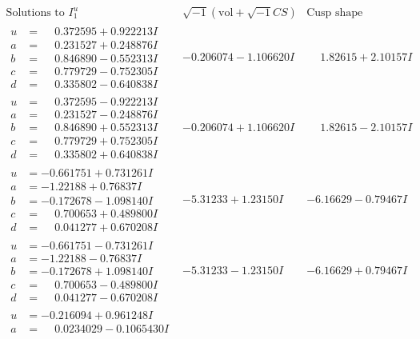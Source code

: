 \documentclass[1p]{elsarticle_modified}
\theoremstyle{definition}
\newcommand{\I}{\sqrt{-1}}
\begin{document}
$$\begin{array}{c|c|c}  
\text{Solutions to }I^u_{1}& \I (\text{vol} + \sqrt{-1}CS) & \text{Cusp shape}\\
 \hline 
\begin{aligned}
u &= \phantom{-}0.372595 + 0.922213 I \\
a &= \phantom{-}0.231527 + 0.248876 I \\
b &= \phantom{-}0.846890 - 0.552313 I \\
c &= \phantom{-}0.779729 - 0.752305 I \\
d &= \phantom{-}0.335802 - 0.640838 I\end{aligned}
 & -0.206074 - 1.106620 I & \phantom{-}1.82615 + 2.10157 I \\ \hline\begin{aligned}
u &= \phantom{-}0.372595 - 0.922213 I \\
a &= \phantom{-}0.231527 - 0.248876 I \\
b &= \phantom{-}0.846890 + 0.552313 I \\
c &= \phantom{-}0.779729 + 0.752305 I \\
d &= \phantom{-}0.335802 + 0.640838 I\end{aligned}
 & -0.206074 + 1.106620 I & \phantom{-}1.82615 - 2.10157 I \\ \hline\begin{aligned}
u &= -0.661751 + 0.731261 I \\
a &= -1.22188 + 0.76837 I \\
b &= -0.172678 - 1.098140 I \\
c &= \phantom{-}0.700653 + 0.489800 I \\
d &= \phantom{-}0.041277 + 0.670208 I\end{aligned}
 & -5.31233 + 1.23150 I & -6.16629 - 0.79467 I \\ \hline\begin{aligned}
u &= -0.661751 - 0.731261 I \\
a &= -1.22188 - 0.76837 I \\
b &= -0.172678 + 1.098140 I \\
c &= \phantom{-}0.700653 - 0.489800 I \\
d &= \phantom{-}0.041277 - 0.670208 I\end{aligned}
 & -5.31233 - 1.23150 I & -6.16629 + 0.79467 I \\ \hline\begin{aligned}
u &= -0.216094 + 0.961248 I \\
a &= \phantom{-}0.0234029 - 0.1065430 I \\

\end{aligned}
\end{array}$$
\end{document}
